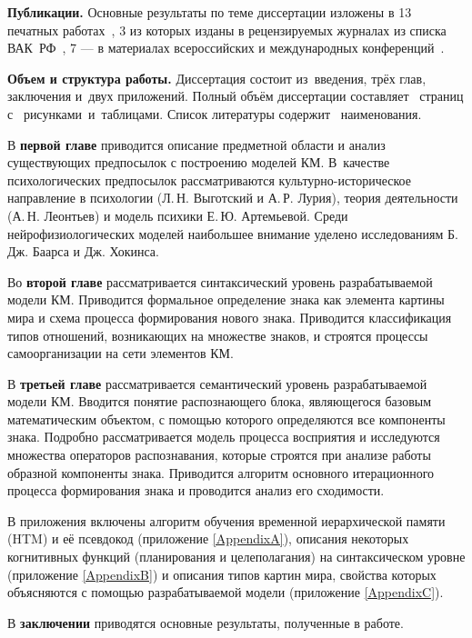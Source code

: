 \textbf{Публикации.} Основные результаты по теме диссертации изложены в 13 печатных работах~\cite{PanovA2011,PanovA2012a,PanovA2012b,PanovA2012c,PanovA2013b,PanovA2014a,PanovT2010b,PanovT2012a,PanovT2012b,PanovT2013,PanovT2014a,PanovT2014b,PanovA2014c}, 3 из которых изданы в рецензируемых журналах из списка ВАК~РФ~\cite{PanovA2012c,PanovA2013b,PanovA2014a}, 7 --- в материалах всероссийских и международных конференций~\cite{PanovA2011,PanovA2012a,PanovA2012b,PanovT2010b,PanovT2012b,PanovT2014a,PanovT2014b}.

\textbf{Объем и структура работы.} Диссертация состоит из~введения, трёх глав, заключения и~двух приложений. Полный объём диссертации составляет \totalpages\ страниц с \totalfigures\ рисунками\iftotaltables\ и\totaltables\ таблицами\fi. Список литературы содержит \totalcitnums\ наименования.

В \textbf{первой главе} приводится описание предметной области и анализ существующих предпосылок с построению моделей КМ. В~качестве психологических предпосылок рассматриваются культурно-историческое направление в психологии (Л.\,Н. Выготский и А.\,Р. Лурия), теория деятельности (А.\,Н. Леонтьев) и модель психики Е.\,Ю. Артемьевой. Среди нейрофизиологических моделей наибольшее внимание уделено исследованиям Б.\,Дж. Баарса и Дж. Хокинса.

Во \textbf{второй главе} рассматривается синтаксический уровень разрабатываемой модели КМ. Приводится формальное определение знака как элемента картины мира и схема процесса формирования нового знака. Приводится классификация типов отношений, возникающих на множестве знаков, и строятся процессы самоорганизации на сети элементов КМ.

В \textbf{третьей главе} рассматривается семантический уровень разрабатываемой модели КМ. Вводится понятие распознающего блока, являющегося базовым математическим объектом, с помощью которого определяются все компоненты знака. Подробно рассматривается модель процесса восприятия и исследуются множества операторов распознавания, которые строятся при анализе работы образной компоненты знака. Приводится алгоритм основного итерационного процесса формирования знака и проводится анализ его сходимости.

В приложения включены алгоритм обучения временной иерархической памяти (HTM) и её псевдокод (приложение \ref{AppendixA}), описания некоторых когнитивных функций (планирования и целеполагания) на синтаксическом уровне (приложение \ref{AppendixB}) и описания типов картин мира, свойства которых объясняются с помощью разрабатываемой модели (приложение \ref{AppendixC}).

В \textbf{заключении} приводятся основные результаты, полученные в работе.
\clearpage